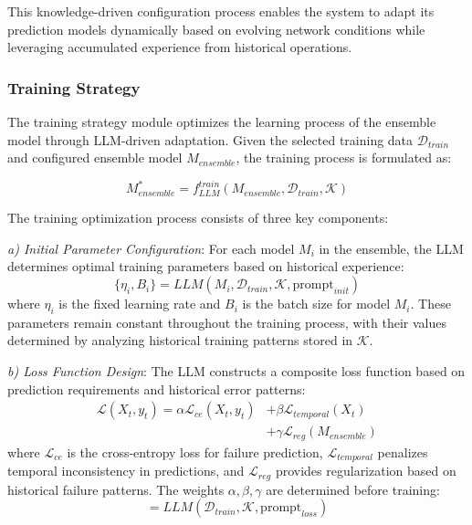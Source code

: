 \documentclass[conference]{IEEEtran}
\begin{document}
This knowledge-driven configuration process enables the system to adapt its prediction models dynamically based on evolving network conditions while leveraging accumulated experience from historical operations.

\subsubsection{Training Strategy}
The training strategy module optimizes the learning process of the ensemble model through LLM-driven adaptation. Given the selected training data $\mathcal{D}_{train}$ and configured ensemble model $M_{ensemble}$, the training process is formulated as:

\begin{equation}
    M_{ensemble}^* = f_{LLM}^{train}(M_{ensemble}, \mathcal{D}_{train}, \mathcal{K})
\end{equation}

The training optimization process consists of three key components:

\textit{a) Initial Parameter Configuration}: For each model $M_i$ in the ensemble, the LLM determines optimal training parameters based on historical experience:
\begin{equation}
    \{\eta_i, B_i\} = LLM(M_i, \mathcal{D}_{train}, \mathcal{K}, \text{prompt}_{init})
\end{equation}
where $\eta_i$ is the fixed learning rate and $B_i$ is the batch size for model $M_i$. These parameters remain constant throughout the training process, with their values determined by analyzing historical training patterns stored in $\mathcal{K}$.

\textit{b) Loss Function Design}: The LLM constructs a composite loss function based on prediction requirements and historical error patterns:
\begin{equation}
    \begin{aligned} 
    \mathcal{L}(X_t, y_t) = \alpha\mathcal{L}_{ce}(X_t, y_t) &+ \beta\mathcal{L}_{temporal}(X_t) \\
    &+ \gamma\mathcal{L}_{reg}(M_{ensemble})
    \end{aligned}
\end{equation}
where $\mathcal{L}_{ce}$ is the cross-entropy loss for failure prediction, $\mathcal{L}_{temporal}$ penalizes temporal inconsistency in predictions, and $\mathcal{L}_{reg}$ provides regularization based on historical failure patterns. The weights $\alpha, \beta, \gamma$ are determined before training:
\begin{equation}
    [\alpha, \beta, \gamma] = LLM(\mathcal{D}_{train}, \mathcal{K}, \text{prompt}_{loss})
\end{equation}
\end{document}

